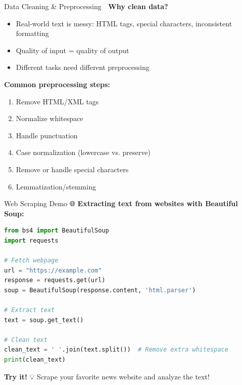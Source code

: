 \documentclass[aspectratio=169]{beamer}
\begin{document}
\begin{frame}[shrink=10]{Data Cleaning \& Preprocessing 📝}
    \textbf{Why clean data?}
    \begin{itemize}\setlength{\itemsep}{0pt}
        \item Real-world text is messy: HTML tags, special characters, inconsistent formatting
        \item Quality of input = quality of output
        \item Different tasks need different preprocessing
    \end{itemize}

    \vspace{0.5em}
    \textbf{Common preprocessing steps:}
    \begin{enumerate}\setlength{\itemsep}{0pt}
        \item Remove HTML/XML tags
        \item Normalize whitespace
        \item Handle punctuation
        \item Case normalization (lowercase vs. preserve)
        \item Remove or handle special characters
        \item Lemmatization/stemming
    \end{enumerate}
\end{frame}

\begin{frame}[fragile]{Web Scraping Demo 🌐}
    \textbf{Extracting text from websites with Beautiful Soup:}

    \begin{lstlisting}[language=Python]
from bs4 import BeautifulSoup
import requests

# Fetch webpage
url = "https://example.com"
response = requests.get(url)
soup = BeautifulSoup(response.content, 'html.parser')

# Extract text
text = soup.get_text()

# Clean text
clean_text = ' '.join(text.split())  # Remove extra whitespace
print(clean_text)
    \end{lstlisting}

    \vspace{0.5em}
    \textbf{Try it!} 💡 Scrape your favorite news website and analyze the text!
\end{frame}
\end{document}
